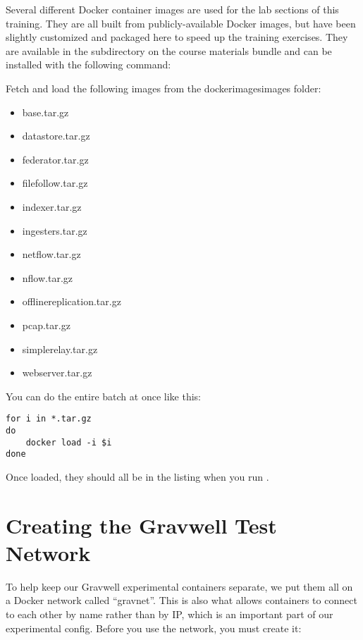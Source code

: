 Several different Docker container images are used for the lab
sections of this training. They are all built from publicly-available
Docker images, but have been slightly customized and packaged here to
speed up the training exercises. They are available in the
 subdirectory on the course materials bundle and
can be installed with the following command:


Fetch and load the following images from the dockerimagesimages folder:

\begin{itemize}
	\item base.tar.gz
	\item datastore.tar.gz
        \item federator.tar.gz
        \item filefollow.tar.gz
	\item indexer.tar.gz
	\item ingesters.tar.gz
        \item netflow.tar.gz
        \item nflow.tar.gz
	\item offlinereplication.tar.gz
	\item pcap.tar.gz
        \item simplerelay.tar.gz
	\item webserver.tar.gz
\end{itemize}

You can do the entire batch at once like this:

\begin{Verbatim}
for i in *.tar.gz
do
    docker load -i $i
done
\end{Verbatim}

Once loaded, they should all be in the listing when you run .

\section{Creating the Gravwell Test Network}

To help keep our Gravwell experimental containers separate, we put them
all on a Docker network called ``gravnet''. This is also what allows
containers to connect to each other by name rather than by IP, which is
an important part of our experimental config. Before you use the
network, you must create it:



